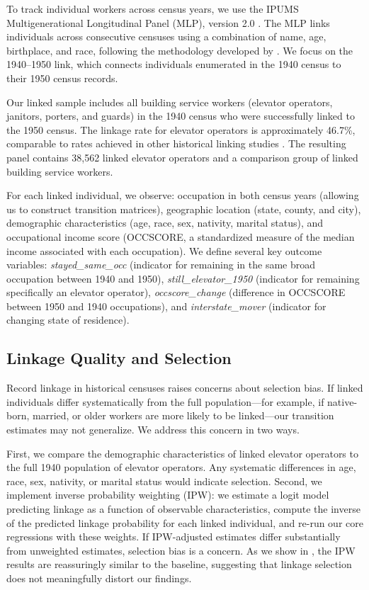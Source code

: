 \documentclass[12pt]{article}
\begin{document}
To track individual workers across census years, we use the IPUMS Multigenerational Longitudinal Panel (MLP), version 2.0 \citep{ruggles2021}. The MLP links individuals across consecutive censuses using a combination of name, age, birthplace, and race, following the methodology developed by \citet{abramitzky2021}. We focus on the 1940--1950 link, which connects individuals enumerated in the 1940 census to their 1950 census records.

Our linked sample includes all building service workers (elevator operators, janitors, porters, and guards) in the 1940 census who were successfully linked to the 1950 census. The linkage rate for elevator operators is approximately 46.7\%, comparable to rates achieved in other historical linking studies \citep{abramitzky2012}. The resulting panel contains 38,562 linked elevator operators and a comparison group of linked building service workers.

For each linked individual, we observe: occupation in both census years (allowing us to construct transition matrices), geographic location (state, county, and city), demographic characteristics (age, race, sex, nativity, marital status), and occupational income score (OCCSCORE, a standardized measure of the median income associated with each occupation). We define several key outcome variables: \emph{stayed\_same\_occ} (indicator for remaining in the same broad occupation between 1940 and 1950), \emph{still\_elevator\_1950} (indicator for remaining specifically an elevator operator), \emph{occscore\_change} (difference in OCCSCORE between 1950 and 1940 occupations), and \emph{interstate\_mover} (indicator for changing state of residence).

\subsection{Linkage Quality and Selection}

Record linkage in historical censuses raises concerns about selection bias. If linked individuals differ systematically from the full population---for example, if native-born, married, or older workers are more likely to be linked---our transition estimates may not generalize. We address this concern in two ways.

First, we compare the demographic characteristics of linked elevator operators to the full 1940 population of elevator operators. Any systematic differences in age, race, sex, nativity, or marital status would indicate selection. Second, we implement inverse probability weighting (IPW): we estimate a logit model predicting linkage as a function of observable characteristics, compute the inverse of the predicted linkage probability for each linked individual, and re-run our core regressions with these weights. If IPW-adjusted estimates differ substantially from unweighted estimates, selection bias is a concern. As we show in , the IPW results are reassuringly similar to the baseline, suggesting that linkage selection does not meaningfully distort our findings.
\end{document}

